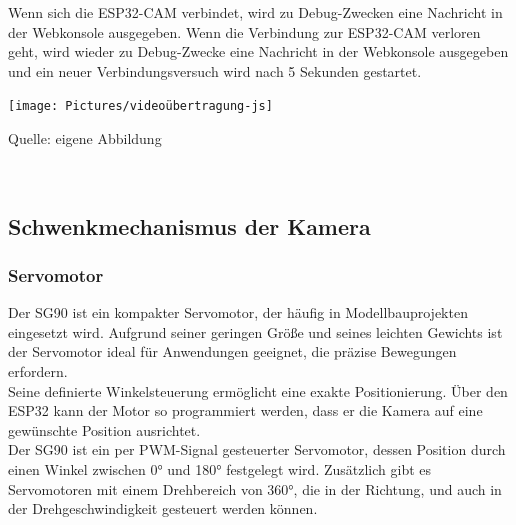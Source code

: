 \documentclass[ngerman,12pt,a4paper]{article}
\begin{document}
			Wenn sich die ESP32-CAM verbindet, wird zu Debug-Zwecken eine Nachricht in der Webkonsole ausgegeben. Wenn die Verbindung zur ESP32-CAM verloren geht, wird wieder zu Debug-Zwecke eine Nachricht in der Webkonsole ausgegeben und ein neuer Verbindungsversuch wird nach 5 Sekunden gestartet.
			\begin{center}
				\begin{minipage}[t]{\textwidth}
					\texttt{[image: Pictures/videoübertragung-js]}
					\label{fig:videoübertragung-js}
					\vspace{-10pt}
					\begin{center}
						\par\small Quelle: eigene Abbildung 
					\end{center}
				\end{minipage} \\[0.75cm]
			\end{center}
		\subsection{Schwenkmechanismus der Kamera}
				\subsubsection{Servomotor} %
				Der SG90 ist ein kompakter Servomotor, der häufig in Modellbauprojekten eingesetzt wird. Aufgrund seiner geringen Größe und seines leichten Gewichts ist der Servomotor ideal für Anwendungen geeignet, die präzise Bewegungen erfordern.\\
				Seine definierte Winkelsteuerung ermöglicht eine exakte Positionierung. Über den ESP32 kann der Motor so programmiert werden, dass er die Kamera auf eine gewünschte Position ausrichtet. \\
				Der SG90 ist ein per PWM-Signal gesteuerter Servomotor, dessen Position durch einen Winkel zwischen 0° und 180° festgelegt wird. Zusätzlich gibt es Servomotoren mit einem Drehbereich von 360°, die in der Richtung, und auch in der Drehgeschwindigkeit gesteuert werden können.
\end{document}
